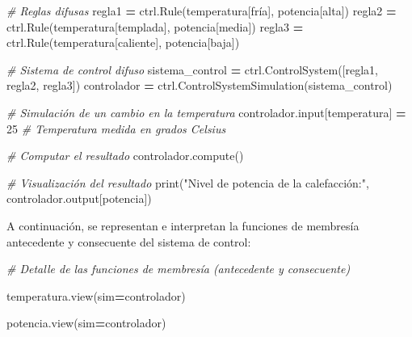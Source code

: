 \documentclass[
  a4paper,
  DIV=11,
  numbers=noendperiod]{scrreprt}
\newenvironment{Shaded}{\begin{snugshade}}{\end{snugshade}}
\newcommand{\BuiltInTok}[1]{#1}
\newcommand{\CommentTok}[1]{\textcolor[rgb]{0.56,0.35,0.01}{\textit{#1}}}
\newcommand{\DecValTok}[1]{\textcolor[rgb]{0.00,0.00,0.81}{#1}}
\newcommand{\NormalTok}[1]{#1}
\newcommand{\OperatorTok}[1]{\textcolor[rgb]{0.81,0.36,0.00}{\textbf{#1}}}
\newcommand{\StringTok}[1]{\textcolor[rgb]{0.31,0.60,0.02}{#1}}
\begin{document}
\begin{Shaded}
\begin{Highlighting}[numbers=left,,]
\CommentTok{\# Reglas difusas}
\NormalTok{regla1 }\OperatorTok{=}\NormalTok{ ctrl.Rule(temperatura[}\StringTok{\textquotesingle{}fría\textquotesingle{}}\NormalTok{], potencia[}\StringTok{\textquotesingle{}alta\textquotesingle{}}\NormalTok{])}
\NormalTok{regla2 }\OperatorTok{=}\NormalTok{ ctrl.Rule(temperatura[}\StringTok{\textquotesingle{}templada\textquotesingle{}}\NormalTok{], potencia[}\StringTok{\textquotesingle{}media\textquotesingle{}}\NormalTok{])}
\NormalTok{regla3 }\OperatorTok{=}\NormalTok{ ctrl.Rule(temperatura[}\StringTok{\textquotesingle{}caliente\textquotesingle{}}\NormalTok{], potencia[}\StringTok{\textquotesingle{}baja\textquotesingle{}}\NormalTok{])}

\CommentTok{\# Sistema de control difuso}
\NormalTok{sistema\_control }\OperatorTok{=}\NormalTok{ ctrl.ControlSystem([regla1, regla2, regla3])}
\NormalTok{controlador }\OperatorTok{=}\NormalTok{ ctrl.ControlSystemSimulation(sistema\_control)}

\CommentTok{\# Simulación de un cambio en la temperatura}
\NormalTok{controlador.}\BuiltInTok{input}\NormalTok{[}\StringTok{\textquotesingle{}temperatura\textquotesingle{}}\NormalTok{] }\OperatorTok{=} \DecValTok{25}  \CommentTok{\# Temperatura medida en grados Celsius}

\CommentTok{\# Computar el resultado}
\NormalTok{controlador.compute()}

\CommentTok{\# Visualización del resultado}
\BuiltInTok{print}\NormalTok{(}\StringTok{"Nivel de potencia de la calefacción:"}\NormalTok{, controlador.output[}\StringTok{\textquotesingle{}potencia\textquotesingle{}}\NormalTok{])}
\end{Highlighting}
\end{Shaded}

A continuación, se representan e interpretan la funciones de membresía
antecedente y consecuente del sistema de control:

\begin{Shaded}
\begin{Highlighting}[numbers=left,,]
\CommentTok{\# Detalle de las funciones de membresía (antecedente y consecuente)}

\NormalTok{temperatura.view(sim}\OperatorTok{=}\NormalTok{controlador) }
\end{Highlighting}
\end{Shaded}

\begin{Shaded}
\begin{Highlighting}[numbers=left,,]
\NormalTok{potencia.view(sim}\OperatorTok{=}\NormalTok{controlador)}
\end{Highlighting}
\end{Shaded}
\end{document}
